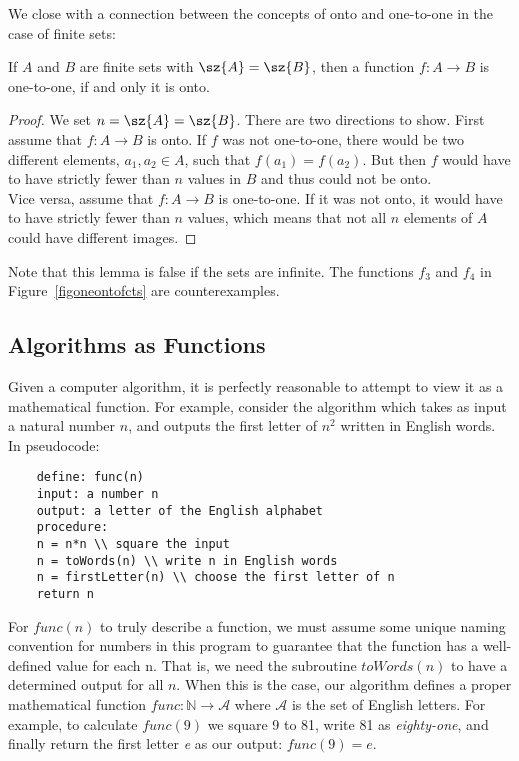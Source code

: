 We close with a connection between the concepts of onto and one-to-one in
the case of finite sets:
\begin{lemma}
\label{lemoneonto}
If $A$ and $B$ are finite sets with $\sz{A}=\sz{B}$, then a function $f\colon A\to B$ is
one-to-one, if and only it is onto.
\end{lemma}
\begin{proof}
We set $n=\sz{A}=\sz{B}$.
There are two directions to show. First assume that $f\colon A\to B$ is onto. If $f$ was
not one-to-one, there would be two different elements, $a_1,a_2\in A$, such that
$f(a_1)=f(a_2)$. But then $f$ would have to have strictly fewer than $n$ values in $B$
and thus could not be onto.\\
Vice versa, assume that $f\colon A\to B$ is one-to-one. If it was not onto, it would
have to have strictly fewer than $n$ values, which means that not all $n$ elements of
$A$ could have different images.
\end{proof}
Note that this lemma is false if the sets are infinite. The functions $f_3$ and $f_4$ in
Figure~\ref{figoneontofcts} are counterexamples.

\subsection{Algorithms as Functions}

Given a computer algorithm, it is perfectly reasonable
to attempt to view it as a mathematical function. For
example, consider the algorithm which takes as input a natural number $n$, and outputs
the first letter of $n^2$ written in English words. In pseudocode:

	\begin{verbatim}
	define: func(n)
	input: a number n
	output: a letter of the English alphabet
	procedure:
	n = n*n \\ square the input
	n = toWords(n) \\ write n in English words
	n = firstLetter(n) \\ choose the first letter of n
	return n
	\end{verbatim}
	
For $func(n)$ to truly describe a function, we must assume some unique naming convention for numbers in this program to guarantee that
the function has a well-defined value for each n. 
That is, we need the subroutine $toWords(n)$ to have a determined output for
all $n$. When this is the case, our algorithm defines a 
proper mathematical function $func: \mathbb{N} \rightarrow \mathcal{A}$ where $\mathcal{A}$
is the set of English letters. For example, to calculate $func(9)$ we square 9 to 81, write 81 as \textit{eighty-one}, and finally return the first letter \textit{e} as our output: $func(9)=e$.

